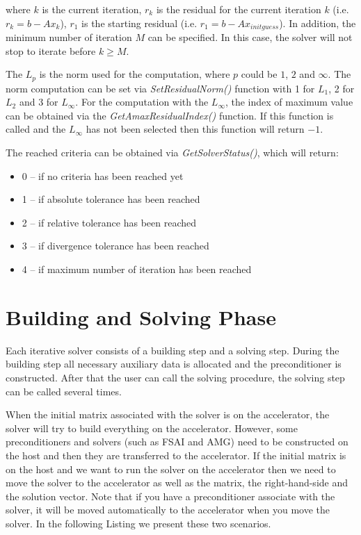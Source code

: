 where $k$ is the current iteration, $r_k$ is the residual for the current iteration $k$ (i.e. $r_k=b-A x_k$), $r_1$ is the starting residual (i.e. $r_1=b-Ax_{initguess}$).
In addition, the minimum number of iteration $M$ can be specified. In this case, the solver will not stop to iterate before $k \geq M$.




The $L_p$ is the norm used for the computation, where $p$ could be $1$, $2$ and $\infty$. The norm computation can be set via \emph{SetResidualNorm()} function with 1 for $L_1$, 2 for $L_2$ and 3 for $L_{\infty}$. For the computation with the $L_{\infty}$, the index of maximum value can be obtained via the \emph{GetAmaxResidualIndex()} function. If this function is called and the $L_{\infty}$ has not been selected then this function will return $-1$.

The reached criteria can be obtained via \emph{GetSolverStatus()}, which will return:

\begin{itemize}
\itemsep0em
\item 0 -- if no criteria has been reached yet
\item 1 -- if absolute tolerance has been reached
\item 2 -- if relative tolerance has been reached
\item 3 -- if divergence tolerance has been reached
\item 4 -- if maximum number of iteration has been reached
\end{itemize}




\section{Building and Solving Phase}

Each iterative solver consists of a building step and a solving step. During the building step all necessary auxiliary data is allocated and the preconditioner is constructed. After that the user can call the solving procedure, the solving step can be called several times. 

When the initial matrix associated with the solver is on the accelerator, the solver will try to build everything on the accelerator. However, some preconditioners and solvers (such as FSAI and AMG) need to be constructed on the host and then they are transferred to the accelerator. If the initial matrix is on the host and we want to run the solver on the accelerator then we need to move the solver to the accelerator as well as the matrix, the right-hand-side and the solution vector. Note that if you have a preconditioner associate with the solver, it will be moved automatically to the accelerator when you move the solver. In the following Listing we present these two scenarios.

